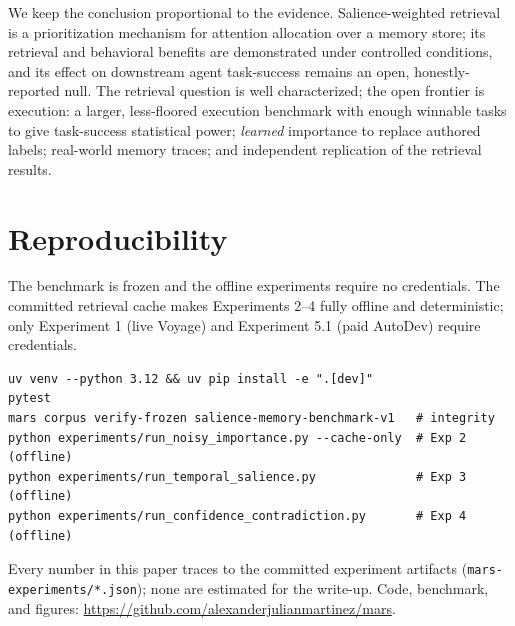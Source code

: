 \documentclass[11pt]{article}
\begin{document}
We keep the conclusion proportional to the evidence. Salience-weighted retrieval is a
prioritization mechanism for attention allocation over a memory store; its retrieval and
behavioral benefits are demonstrated under controlled conditions, and its effect on
downstream agent task-success remains an open, honestly-reported null. The retrieval
question is well characterized; the open frontier is execution: a larger, less-floored
execution benchmark with enough winnable tasks to give task-success statistical power;
\emph{learned} importance to replace authored labels; real-world memory traces; and
independent replication of the retrieval results.

\section*{Reproducibility}
The benchmark is frozen and the offline experiments require no credentials. The committed
retrieval cache makes Experiments 2--4 fully offline and deterministic; only Experiment 1
(live Voyage) and Experiment 5.1 (paid AutoDev) require credentials.
\begin{verbatim}
uv venv --python 3.12 && uv pip install -e ".[dev]"
pytest
mars corpus verify-frozen salience-memory-benchmark-v1   # integrity
python experiments/run_noisy_importance.py --cache-only  # Exp 2 (offline)
python experiments/run_temporal_salience.py              # Exp 3 (offline)
python experiments/run_confidence_contradiction.py       # Exp 4 (offline)
\end{verbatim}
Every number in this paper traces to the committed experiment artifacts
(\texttt{mars-experiments/*.json}); none are estimated for the write-up. Code, benchmark,
and figures: \url{https://github.com/alexanderjulianmartinez/mars}.

\appendix
\end{document}
